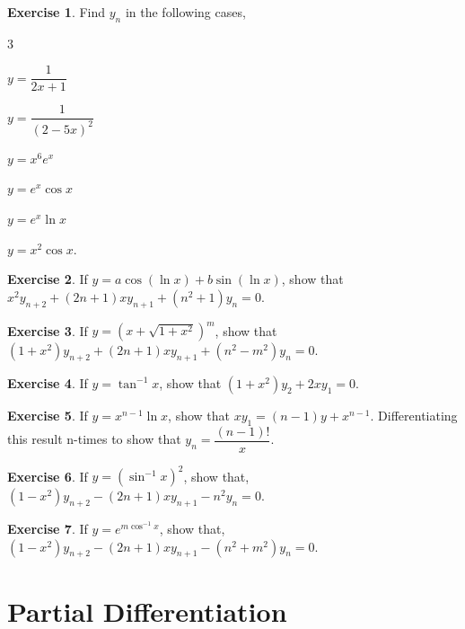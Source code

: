 \documentclass[../../main.tex]{subfiles}
\theoremstyle{definition}
\newtheorem{exercise}{Exercise}[section]
\begin{document}
\begin{exercise}
Find $y_n$ in the following cases,
\begin{multicols}{3}
\begin{enumerate*}[label=(\roman*)]
    \item $y=\dfrac{1}{2x+1}$
    \item $y=\dfrac{1}{(2-5x)^2}$
    \item $y=x^6e^x$
    \item $y=e^x\cos x$
    \item $y=e^x\ln x$
    \item $y=x^2\cos x$. 
\end{enumerate*}
\end{multicols}
\end{exercise}

\begin{exercise}
If $y=a \cos(\ln x)+b \sin (\ln x)$, show that $x^2y_{n+2}+(2n+1)xy_{n+1}+(n^2+1)y_n=0$.
\end{exercise}

\begin{exercise}
If $y= (x+\sqrt{1+x^2})^m$, show that $(1+x^2)y_{n+2}+(2n+1)xy_{n+1}+(n^2-m^2)y_n=0$. 
\end{exercise}

\begin{exercise}
If $y=\tan^{-1} x$, show that $(1+x^2)y_2+2xy_1=0$. 
\end{exercise}

\begin{exercise}
If $y=x^{n-1}\ln x$, show that $xy_1=(n-1)y+x^{n-1}$. Differentiating this result n-times to show that $y_n=\dfrac{(n-1)!}{x}$.
\end{exercise}

\begin{exercise}
If $y= (\sin^{-1} x)^2$, show that, $(1-x^2)y_{n+2}-(2n+1)xy_{n+1}-n^2y_n=0$.    
\end{exercise}

\begin{exercise}
If $y=e^{m\cos^{-1}x}$, show that, $(1-x^2)y_{n+2}-(2n+1)xy_{n+1}-(n^2+m^2)y_n=0$.
\end{exercise}




\section{Partial Differentiation}
\end{document}
